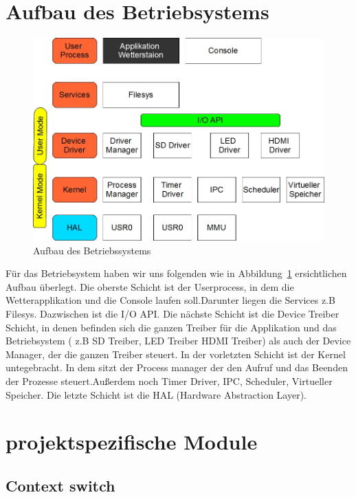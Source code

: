 \documentclass[10pt,a4paper,fleqn]{article}
\begin{document}
\section{Aufbau des Betriebsystems}

	\begin{figure}[h]
		\includegraphics[scale=0.5]{Aufbau.jpg}
		\caption{Aufbau des Betriebssystems}
		\label{fig01}
	\end{figure}
	
	Für das Betriebsystem haben wir uns folgenden wie in Abbildung~\ref{fig01} ersichtlichen
		Aufbau überlegt. Die oberste Schicht ist der
		Userprocess, in dem die Wetterapplikation und die Console laufen soll.Darunter liegen
		die Services z.B Filesys. Dazwischen ist die I/O API. Die nächste Schicht ist die
		Device Treiber Schicht, in denen befinden sich die ganzen Treiber für die Applikation und das
		Betriebsystem ( z.B SD Treiber, LED Treiber HDMI Treiber) als auch der Device Manager, der
		die ganzen Treiber steuert. In der vorletzten Schicht ist der Kernel untegebracht. In dem
		sitzt der Process manager der den Aufruf und das Beenden der Prozesse steuert.Außerdem noch
		Timer Driver, IPC, Scheduler, Virtueller Speicher. Die letzte Schicht ist die HAL (Hardware
		Abstraction Layer).

\section{projektspezifische Module}

\subsection{Context switch}
\end{document}
